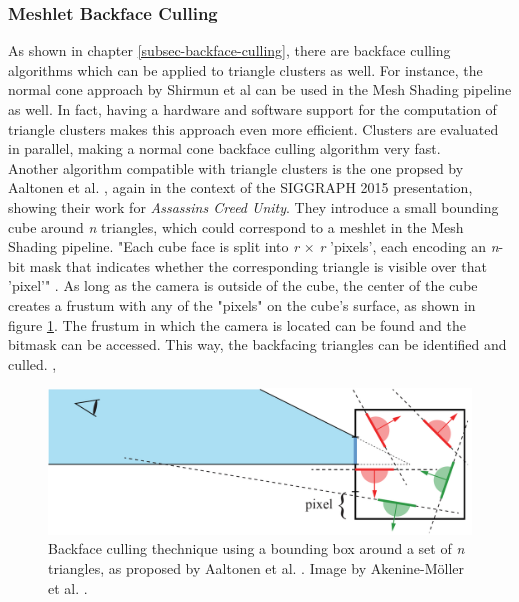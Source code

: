 \subsubsection{Meshlet Backface Culling} \label{subsubsec-meshlet-backface-culling}

As shown in chapter \ref{subsec-backface-culling}, there are backface culling algorithms which can be applied to 
triangle clusters as well. For instance, the normal cone approach by Shirmun et al \cite{Shirmun1993} can be used 
in the Mesh Shading pipeline as well. In fact, having a hardware and software support for the computation of triangle 
clusters makes this approach even more efficient. Clusters are evaluated in parallel, making a normal cone backface 
culling algorithm very fast. \\

\noindent
Another algorithm compatible with triangle clusters is the one propsed by Aaltonen et al. \cite{Aaltonen2015}, again 
in the context of the SIGGRAPH 2015 presentation, showing their work for \emph{Assassins Creed Unity}. They introduce 
a small bounding cube around \emph{n} triangles, which could correspond to a meshlet in the Mesh Shading pipeline. 
"Each cube face is split into \emph{r} \begin{math}\times\end{math} \emph{r} 'pixels', each encoding an \emph{n}-
bit mask that indicates whether the corresponding triangle is visible over that 'pixel'" \cite{AkenineMoeller2018}.
As long as the camera is outside of the cube, the center of the cube creates a frustum with any of the "pixels" on 
the cube's surface, as shown in figure \ref{fig:backface-culling-ac-unity}. The frustum in which the camera is 
located can be found and the bitmask can be accessed. This way, the backfacing triangles can be identified and 
culled. \cite{Aaltonen2015}, \cite{AkenineMoeller2018}

\begin{figure}[h]
    \centering
    \includegraphics[width=\linewidth]{images/graphics/backface-culling-ac-unity.png}
    \caption{Backface culling thechnique using a bounding box around a set of \emph{n} triangles, 
    as proposed by Aaltonen et al. \cite{Aaltonen2015}. Image by Akenine-Möller et al. \cite{AkenineMoeller2018}.}
    \label{fig:backface-culling-ac-unity}
\end{figure}


